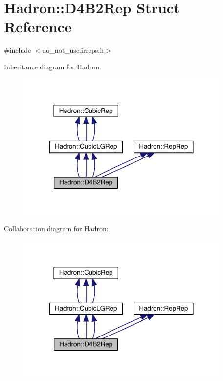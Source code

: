 \hypertarget{structHadron_1_1D4B2Rep}{}\section{Hadron\+:\+:D4\+B2\+Rep Struct Reference}
\label{structHadron_1_1D4B2Rep}


{\ttfamily \#include $<$do\+\_\+not\+\_\+use.\+irreps.\+h$>$}



Inheritance diagram for Hadron\+:
\nopagebreak
\begin{figure}[H]
\begin{center}
\leavevmode
\includegraphics[width=300pt]{dd/d69/structHadron_1_1D4B2Rep__inherit__graph}
\end{center}
\end{figure}


Collaboration diagram for Hadron\+:
\nopagebreak
\begin{figure}[H]
\begin{center}
\leavevmode
\includegraphics[width=300pt]{d0/d73/structHadron_1_1D4B2Rep__coll__graph}
\end{center}
\end{figure}
